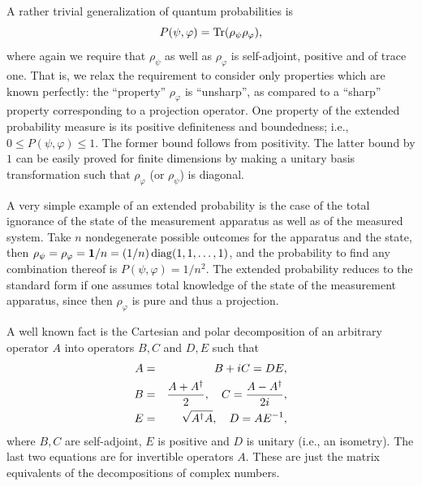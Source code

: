 A rather trivial generalization of quantum probabilities is
\begin{equation}
P(\psi ,\varphi)={\rm Tr}(\rho_\psi  \rho_\varphi),
\end{equation}
where again we require that $\rho_\psi$ as well as $\rho_\varphi$
is self-adjoint, positive and of trace one.
That is, we relax the requirement to consider only properties
which are known perfectly: the ``property'' $\rho_\varphi$ is ``unsharp'', as
compared to a ``sharp'' property corresponding to a projection operator.
One property of the extended probability measure is its positive definiteness and boundedness;
i.e., $0\le P(\psi ,\varphi) \le 1$. The former
bound follows from positivity.
The latter bound by $1$ can be easily
proved for finite dimensions by making a unitary basis transformation such that $\rho_\varphi$ (or $\rho_\psi$) is
diagonal.


A very simple example of an extended probability is the case of the total ignorance of the
state of the measurement apparatus as well as of the measured system.
Take $n$ nondegenerate possible outcomes for
the apparatus and the state, then $\rho_\psi=\rho_\varphi={\bf 1}/n=(1/ n)\,{\rm diag}(1,1,\ldots, 1)$,
and the probability to find any combination thereof is
$P(\psi ,\varphi)=1/n^2$.
The extended probability reduces to the standard form
if one assumes total knowledge of the state
of the measurement apparatus, since then $\rho_\varphi$ is pure and thus a projection.




A well known fact is the Cartesian and polar decomposition of an arbitrary
operator $A$ into operators $B,C$ and $D,E$ such that
\begin{eqnarray}
A&=&B+iC = DE,  \nonumber \\
B&=&{A+A^\dagger \over 2}, \quad C={A-A^\dagger \over 2i},\nonumber  \\
E&=&\sqrt{A^\dagger A},\quad D={AE^{-1}},\nonumber
\end{eqnarray}
where $B,C$ are self-adjoint, $E$ is positive and $D$ is unitary (i.e., an isometry).
The last two equations are for invertible operators $A$.
These are just the matrix equivalents of the decompositions of complex numbers.

